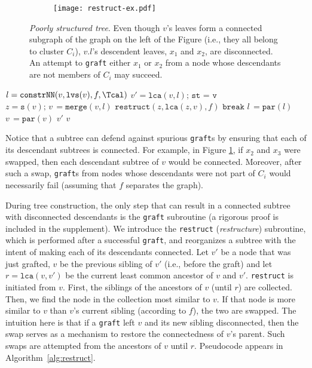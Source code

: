 \documentclass{article} \usepackage[utf8]{inputenc} \usepackage[T1]{fontenc}    \usepackage{hyperref}       \usepackage{url}            \usepackage{booktabs}       \usepackage{amsfonts}       \usepackage{nicefrac}       \usepackage{microtype}      \usepackage{geometry}
\newcommand{\graft}{\texttt{graft}\xspace}
\newcommand{\grafts}{\texttt{graft}s\xspace}
\newcommand{\rst}{\texttt{restruct}\xspace}
\newcommand{\lvs}[1]{\ensuremath{\texttt{lvs}(#1)}}
\newcommand{\conNN}{\ensuremath{\texttt{constrNN}}\xspace}
\newcommand{\lca}[2]{\ensuremath{\texttt{lca}(#1, #2)}}
\newcommand{\merge}[2]{\ensuremath{\texttt{merge}(#1, #2)}}
\newcommand{\sib}[1]{\ensuremath{\texttt{s}}(#1)\xspace}
\newcommand{\parent}[1]{\ensuremath{\texttt{par}}(#1)\xspace}
\begin{document}
\begin{figure}[t]
  \captionsetup[subfigure]{justification=centering}
  \centering
\begin{subfigure}[h]{0.7\columnwidth}
  \centerline{\texttt{[image: restruct-ex.pdf]}}
\end{subfigure}
\caption{\emph{Poorly structured tree}. Even though $v$'s leaves form
  a connected subgraph of the graph on the left of the Figure (i.e.,
  they all belong to cluster $C_i$), $v.l$'s descendent leaves, $x_1$
  and $x_2$, are disconnected. An attempt to \texttt{graft} either
  $x_1$ or $x_2$ from a node whose descendants are not members of
  $C_i$ may succeed.}
\label{fig:bad-struct}
\end{figure}
 \begin{algorithm}[t!]
   \caption{\graft$(v , \Tcal, f)$}
   \label{alg:graft}
\begin{algorithmic}
  \STATE $l = \conNN (v, \lvs{v}, f, \Tcal)$
  \STATE $v'= \lca{v}{l}\texttt{; st = v}$
  \WHILE{$v \neq v' \wedge l \neq v' \wedge \sib{v} \neq l$}
    \IF{$f(v, l) > \max[f(v, \sib{v}, f(l, \sib{l})]$}
      \STATE $z = \sib{v} \texttt{; }v\, = \merge{v}{l}$
      \STATE $\texttt{restruct}(z, \lca{z}{v}, f)$
      \STATE $\texttt{break}$
    \ENDIF
    \IF{$f(v, l)\, <\, f(l, \sib{l})$}
      \STATE $l\, = \parent{l}$
    \ENDIF
    \IF{$f(v, l)\, <\, f(v, \sib{v})$}
      \STATE $v\, = \parent{v}$
    \ENDIF
   \ENDWHILE
       $v'$
    \ELSE
       $v$
    \ENDIF
\end{algorithmic}
\end{algorithm}
 
Notice that a subtree can defend against spurious \grafts by ensuring
that each of its descendant subtrees is connected. For example, in
Figure \ref{fig:bad-struct}, if $x_2$ and $x_3$ were swapped, then
each descendant subtree of $v$ would be connected. Moreover, after
such a swap, \grafts from nodes whose descendants were not part of
$C_i$ would necessarily fail (assuming that $f$ separates the
graph).

During tree construction, the only step that can result in a connected
subtree with disconnected descendants is the \graft subroutine (a
rigorous proof is included in the supplement). We introduce the \rst
(\emph{restructure}) subroutine, which is performed after a successful
\graft, and reorganizes a subtree with the intent of making each of
its descendants connected. Let $v'$ be a node that was just grafted,
$v$ be the previous sibling of $v'$ (i.e., before the graft) and let
$r=\lca{v}{v'}$ be the current least common ancestor of $v$ and
$v'$. \rst is initiated from $v$. First, the siblings of the ancestors
of $v$ (until $r$) are collected. Then, we find the node in the
collection most similar to $v$. If that node is more similar to $v$
than $v$'s current sibling (according to $f$), the two are
swapped. The intuition here is that if a \graft left $v$ and its new
sibling disconnected, then the swap serves as a mechanism to restore
the connectedness of $v$'s parent. Such swaps are attempted from the
ancestors of $v$ until $r$.  Pseudocode appears in
Algorithm~\ref{alg:restruct}.
\end{document}
